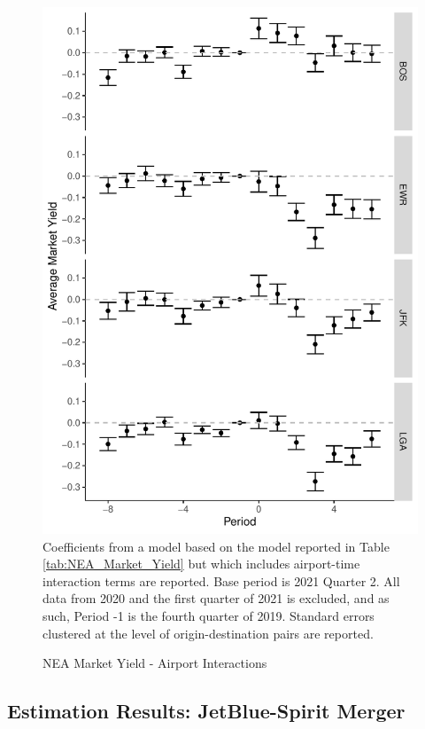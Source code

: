 \documentclass{article}
\begin{document}
\begin{appendices}
	\begin{figure}
		\caption{NEA Market Yield - Airport Interactions}
		\label{fig:NEA_Market_Yield_Interaction}
		\includegraphics[width = \linewidth]{NEA_Airport_Yield_Graph}
		\footnotesize{Coefficients from a model based on the model reported in Table \ref{tab:NEA_Market_Yield} but which includes airport-time interaction terms are reported. Base period is 2021 Quarter 2. All data from 2020 and the first quarter of 2021 is excluded, and as such, Period -1 is the fourth quarter of 2019. Standard errors clustered at the level of origin-destination pairs are reported. }
	\end{figure}	
	
	\subsection{Estimation Results: JetBlue-Spirit Merger}
	

\end{appendices}
\end{document}
